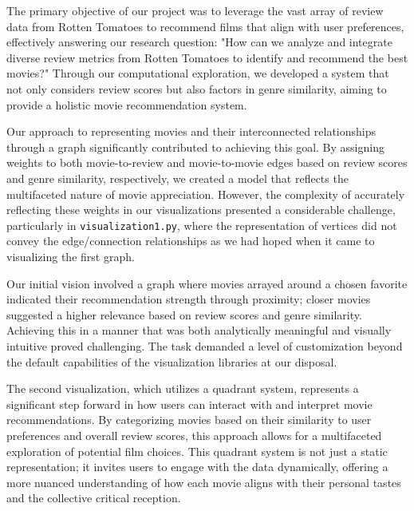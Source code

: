\documentclass[fontsize=11pt]{article}
\begin{document}
\noindent The primary objective of our project was to leverage the vast array of review data from Rotten Tomatoes to recommend films that align with user preferences, effectively answering our research question: "How can we analyze and integrate diverse review metrics from Rotten Tomatoes to identify and recommend the best movies?" Through our computational exploration, we developed a system that not only considers review scores but also factors in genre similarity, aiming to provide a holistic movie recommendation system. 
\vspace{0.5cm}

\noindent Our approach to representing movies and their interconnected relationships through a graph significantly contributed to achieving this goal. By assigning weights to both movie-to-review and movie-to-movie edges based on review scores and genre similarity, respectively, we created a model that reflects the multifaceted nature of movie appreciation. However, the complexity of accurately reflecting these weights in our visualizations presented a considerable challenge, particularly in \texttt{visualization1.py}, where the representation of vertices did not convey the edge/connection relationships as we had hoped when it came to visualizing the first graph.
\vspace{0.5cm}

\noindent Our initial vision involved a graph where movies arrayed around a chosen favorite indicated their recommendation strength through proximity; closer movies suggested a higher relevance based on review scores and genre similarity. Achieving this in a manner that was both analytically meaningful and visually intuitive proved challenging. The task demanded a level of customization beyond the default capabilities of the visualization libraries at our disposal.
\vspace{0.5cm}

\noindent The second visualization, which utilizes a quadrant system, represents a significant step forward in how users can interact with and interpret movie recommendations. By categorizing movies based on their similarity to user preferences and overall review scores, this approach allows for a multifaceted exploration of potential film choices. This quadrant system is not just a static representation; it invites users to engage with the data dynamically, offering a more nuanced understanding of how each movie aligns with their personal tastes and the collective critical reception.
\vspace{0.5cm}
\end{document}
